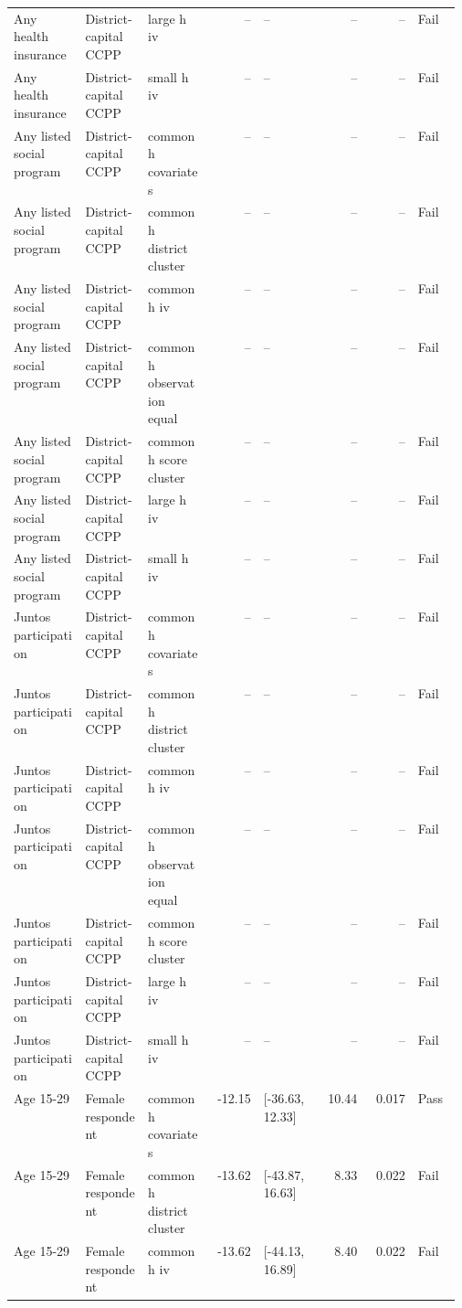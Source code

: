 \begin{longtable}{@{}p{0.16\linewidth}p{0.14\linewidth}p{0.14\linewidth}rp{0.13\linewidth}rrl@{}}
Any health insurance & District-capital CCPP & large h iv & -- & -- & -- & -- & Fail \\
Any health insurance & District-capital CCPP & small h iv & -- & -- & -- & -- & Fail \\
Any listed social program & District-capital CCPP & common h covariates & -- & -- & -- & -- & Fail \\
Any listed social program & District-capital CCPP & common h district cluster & -- & -- & -- & -- & Fail \\
Any listed social program & District-capital CCPP & common h iv & -- & -- & -- & -- & Fail \\
Any listed social program & District-capital CCPP & common h observation equal & -- & -- & -- & -- & Fail \\
Any listed social program & District-capital CCPP & common h score cluster & -- & -- & -- & -- & Fail \\
Any listed social program & District-capital CCPP & large h iv & -- & -- & -- & -- & Fail \\
Any listed social program & District-capital CCPP & small h iv & -- & -- & -- & -- & Fail \\
Juntos participation & District-capital CCPP & common h covariates & -- & -- & -- & -- & Fail \\
Juntos participation & District-capital CCPP & common h district cluster & -- & -- & -- & -- & Fail \\
Juntos participation & District-capital CCPP & common h iv & -- & -- & -- & -- & Fail \\
Juntos participation & District-capital CCPP & common h observation equal & -- & -- & -- & -- & Fail \\
Juntos participation & District-capital CCPP & common h score cluster & -- & -- & -- & -- & Fail \\
Juntos participation & District-capital CCPP & large h iv & -- & -- & -- & -- & Fail \\
Juntos participation & District-capital CCPP & small h iv & -- & -- & -- & -- & Fail \\
Age 15-29 & Female respondent & common h covariates & -12.15 & [-36.63, 12.33] & 10.44 & 0.017 & Pass \\
Age 15-29 & Female respondent & common h district cluster & -13.62 & [-43.87, 16.63] & 8.33 & 0.022 & Fail \\
Age 15-29 & Female respondent & common h iv & -13.62 & [-44.13, 16.89] & 8.40 & 0.022 & Fail \\

\end{longtable}
